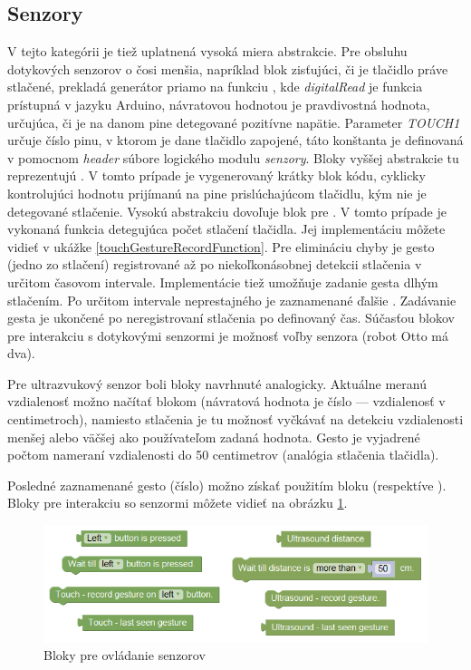 \subsection{Senzory}
V tejto kategórii je tiež uplatnená vysoká miera abstrakcie. Pre obsluhu dotykových senzorov o čosi menšia, napríklad blok zisťujúci, či je tlačidlo práve stlačené, prekladá generátor priamo na funkciu , kde \textit{digitalRead} je funkcia prístupná v jazyku Arduino, návratovou hodnotou je pravdivostná hodnota, určujúca, či je na danom pine detegované pozitívne napätie. Parameter \textit{TOUCH1} určuje číslo pinu, v ktorom je dane tlačidlo zapojené, táto konštanta je definovaná v pomocnom \textit{header} súbore logického modulu \textit{senzory}. Bloky vyššej abstrakcie tu reprezentujú . V tomto prípade je vygenerovaný krátky blok kódu, cyklicky kontrolujúci hodnotu prijímanú na pine prislúchajúcom tlačidlu, kým nie je detegované stlačenie. Vysokú abstrakciu dovoľuje blok pre . V tomto prípade je vykonaná funkcia detegujúca počet stlačení tlačidla. Jej implementáciu môžete vidieť v ukážke \ref{touchGestureRecordFunction}. Pre elimináciu chyby je gesto (jedno zo stlačení) registrované až po niekoľkonásobnej detekcii stlačenia v určitom časovom intervale. Implementácie tiež umožňuje zadanie gesta dlhým stlačením. Po určitom intervale neprestajného  je zaznamenané ďalšie . Zadávanie gesta je ukončené po neregistrovaní stlačenia po definovaný čas. Súčasťou blokov pre interakciu s dotykovými senzormi je možnosť voľby senzora (robot Otto má dva).

Pre ultrazvukový senzor boli bloky navrhnuté analogicky. Aktuálne meranú vzdialenosť možno načítať blokom  (návratová hodnota je číslo --- vzdialenosť v centimetroch), namiesto stlačenia je tu možnosť vyčkávať na detekciu vzdialenosti menšej alebo väčšej ako používateľom zadaná hodnota. Gesto je vyjadrené počtom nameraní vzdialenosti do 50 centimetrov (analógia stlačenia tlačidla).

Posledné zaznamenané gesto (číslo) možno získať použitím bloku  (respektíve ). Bloky pre interakciu so senzormi môžete vidieť na obrázku \ref{obr:sensor-blocks}.

\begin{figure}[bh!]
\centerline{\includegraphics[]{images/sensor-blocks}}
\caption[Bloky pre ovládanie senzorov]{Bloky pre ovládanie senzorov}
\label{obr:sensor-blocks}
\end{figure}

